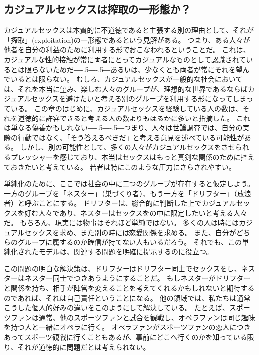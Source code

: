 \documentclass[paper=a4,book,openany]{jlreq}
\def\DDASH{―\kern-.5\zw―\kern-.5\zw―} %
\begin{document}
\subsection{カジュアルセックスは搾取の一形態か？}

カジュアルセックスは本質的に不道徳であると主張する別の理由として、それが「搾取」(exploitation)の一形態であるという見解がある。
つまり、ある人々が他者を自分の利益のために利用する形でおこなわれるということだ。
これは、カジュアルな性的接触が常に両者にとってカジュアルなものとして認識されているとは限らないためだ{\DDASH}あるいは、少なくとも両者が常にそれを望んでいるとは限らない。
むしろ、カジュアルセックスが一般的な社会においては、それを本当に望み、楽しむ人々のグループが、理想的な世界であるならばカジュアルセックスを避けたいと考える別のグループを利用する形になってしまっている。
この章のはじめに、カジュアルセックスを経験している人の数は、それを道徳的に許容できると考える人の数よりもはるかに多いと指摘した。
これは単なる偽善かもしれない{\DDASH}つまり、人々は世論調査では、自分の実際の行動ではなく、「そう答えるべきだ」と考える意見を述べている可能性がある。
しかし、別の可能性として、多くの人々がカジュアルセックスをさせられるプレッシャーを感じており、本当はセックスはもっと真剣な関係のために控えておきたいと考えている。
若者は特にこのような圧力にさらされやすい。

単純化のために、ここでは社会の中に二つのグループが存在すると仮定しよう。
一方のグループを「ネスター」（巣づくり者）、もう一方を「ドリフター」（放浪者）と呼ぶことにする。
ドリフターは、総合的に判断した上でカジュアルセックスを好む人々であり、ネスターはセックスをの中に限定したいと考える人々だ。
もちろん、現実には物事はそれほど単純ではない。
多くの人は時にはカジュアルセックスを求め、また別の時には恋愛関係を求める。
また、自分がどちらのグループに属するのか確信が持てない人もいるだろう。
それでも、この単純化されたモデルは、関連する問題を明確に提示するのに役立つ。

この問題の明白な解決策は、ドリフターはドリフター同士でセックスをし、ネスターはネスター同士でつきあうようにすることだ。
もしネスターがドリフターと関係を持ち、相手が陣営を変えることを考えてくれるかもしれないと期待するのであれば、それは自己責任ということになる。
他の領域では、私たちは通常こうした個人的好みの違いをこのようにして解決している。
たとえば、スポーツファンは通常、他のスポーツファンと試合を観戦し、オペラファンは同じ趣味を持つ人と一緒にオペラに行く。
オペラファンがスポーツファンの恋人につきあってスポーツ観戦に行くこともあるが、事前にどこへ行くのかを知っている限り、それが道徳的に問題だとは考えられない。
\end{document}
